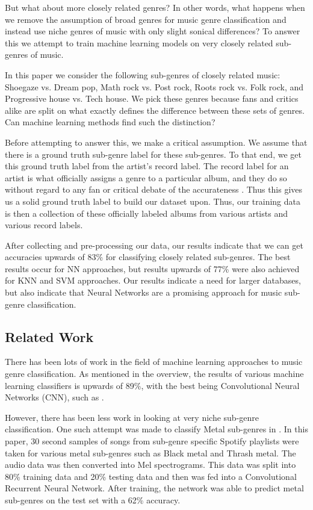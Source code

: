 \documentclass[letterpaper, 12 pt, conference]{ieeeconf}  %
\begin{document}
But what about more closely related genres? In other words, what happens when we remove the assumption of broad genres for music genre classification and instead use niche genres of music with only slight sonical differences?  To answer this we attempt to train machine learning models on very closely related sub-genres of music. 

In this paper we consider the following sub-genres of closely related music: Shoegaze vs. Dream pop, Math rock vs. Post rock, Roots rock vs. Folk rock, and Progressive house vs. Tech house. We pick these genres because fans and critics alike are split on what exactly defines the difference between these sets of genres. Can machine learning methods find such the distinction? 

Before attempting to answer this, we make a critical assumption. We assume that there is a ground truth sub-genre label for these sub-genres. To that end, we get this ground truth label from the artist's record label. The record label for an artist is what officially assigns a genre to a particular album, and they do so without regard to any fan or critical debate of the accurateness \cite{c8}. Thus this gives us a solid ground truth label to build our dataset upon. Thus, our training data is then a collection of these officially labeled albums from various artists and various record labels.

After collecting and pre-processing our data, our results indicate that we can get accuracies upwards of 83\%  for classifying closely related sub-genres. The best results occur for NN approaches, but results upwards of 77\% were also achieved for KNN and SVM approaches. Our results indicate a need for larger databases, but also indicate that Neural Networks are a promising approach for music sub-genre classification. 




\subsection{Related Work}


There has been lots of work in the field of machine learning approaches to music genre classification. As mentioned in the overview, the results of various machine learning classifiers is upwards of 89\%, with the best being Convolutional Neural Networks (CNN),  such as \cite{c4}. 

However, there has been less work in looking at very niche sub-genre classification. One such attempt was made to classify Metal sub-genres in \cite{c5}. In this paper, 30 second samples of songs from sub-genre specific Spotify playlists were taken for various metal sub-genres such as Black metal and Thrash metal. The audio data was then converted into Mel spectrograms. This data was split into 80\% training data and 20\% testing data and then was fed into a Convolutional Recurrent Neural Network. After training, the network was able to predict metal sub-genres on the test set with a 62\% accuracy. 
\end{document}
